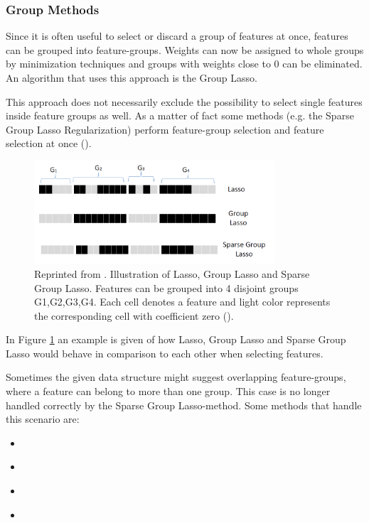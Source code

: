 \subsubsection{Group Methods}
\label{sec:methods.structured.group}

  
Since it is often useful to select or discard a group of features at once,
features can be grouped into feature-groups. Weights can now be assigned to
whole groups by minimization techniques and groups with weights close to $0$ can be
eliminated. An algorithm that uses this approach is the Group Lasso. 

This approach does not necessarily exclude the possibility to select single
features inside feature groups as well. As a matter of fact some methods
(e.g. the Sparse Group Lasso Regularization) perform feature-group selection and
feature selection at once (\cite{Tang:14}).

\begin{figure}[!ht]
  \centering 
  \includegraphics[width=0.8\textwidth]{chapters/methods/structured/group_lasso}
  \caption{Reprinted from \cite{Tang:14}. Illustration of Lasso, Group Lasso
  and Sparse Group Lasso.
  Features can be grouped into 4 disjoint groups {G1,G2,G3,G4}. Each cell denotes a feature and light color
represents the corresponding cell with coefficient zero (\cite{Tang:14}).}
  \label{fig:methods.structured.group.lasso}
\end{figure}

In Figure \ref{fig:methods.structured.group.lasso} an example is given of
how Lasso, Group Lasso and Sparse Group Lasso would behave in comparison
to each other when selecting features. 

Sometimes the given data structure might suggest overlapping feature-groups,
where a feature can belong to more than one group. This case is no longer
handled correctly by the Sparse Group Lasso-method. Some methods that handle
this scenario are:

\begin{itemize}
  \item \cite{Liu:10}
  \item \cite{Kim:10}
  \item \cite{Jenatton:10}
  \item \cite{Jacob:09}
\end{itemize}





